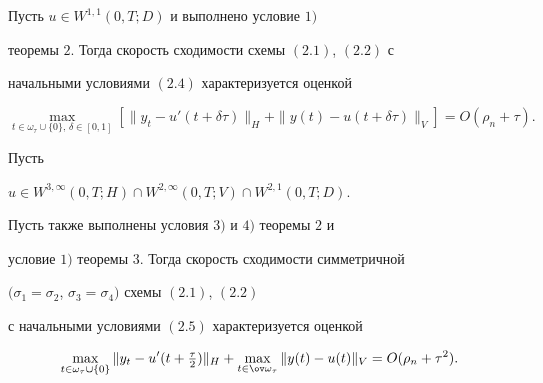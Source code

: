\begin{thm}


Пусть $u\in W^{1,1}(0,T;D)$ и выполнено условие $1)$


теоремы $2$. Тогда скорость сходимости схемы $(2.1)$, $(2.2)$ с


начальными условиями $(2.4)$ характеризуется оценкой


\begin{equation}


\max\limits_{t\in\omega_\tau\cup\{0\},\,\delta\in[0,1]}[\|y_t-


u'(t+\delta\tau)\|_H+\|y(t)-u(t+\delta\tau)\|_V]


=O(\rho_n+\tau).


\end{equation}


\end{thm}





\begin{thm}


Пусть


$u\in W^{3,\infty}(0,T;H)\cap W^{2,\infty}(0,T;V)\cap W^{2,1}(0,T;D)$.


Пусть также выполнены условия $3)$ и $4)$ теоремы $2$ и


условие $1)$ теоремы $3$. Тогда скорость сходимости симметричной


$(\sigma_1=\sigma_2$, $\sigma_3=\sigma_4)$ схемы $(2.1)$, $(2.2)$


с начальными условиями $(2.5)$ характеризуется оценкой


\begin{equation}


\max\limits_{t\in\omega_\tau\cup\{0\}}\|y_t-u'(t+\tfrac{\tau}2)\|_H+


\max\limits_{t\in\ov\omega_{\tau}}\|y(t)-u(t)\|_V={O}(\rho_n+\tau^2).


\end{equation}


\end{thm}





